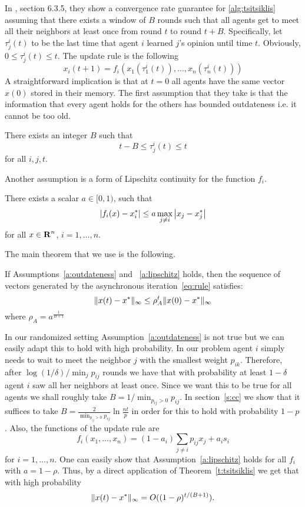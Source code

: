 In \cite{BT97}, section 6.3.5, they show a convergence rate guarantee for
\ref{alg:tsitsiklis} assuming that there exists
a window of $B$ rounds such that all agents get to meet all their
neighbors at least once from round $t$ to round $t+B$.
Specifically, let $\tau_j^i(t)$ to be the last time that agent $i$
learned $j$'s opinion until time $t$. Obviously, $0\leq \tau_j^i(t) \leq t$.
The update rule is the following
\begin{equation}\label{eq:rule}
x_i(t+1) = f_i(x_1(\tau_1^i(t)),\ldots, x_n(\tau_n^i(t)))
\end{equation}
A straightforward implication is that at $t =0$ all agents have the same 
vector $x(0)$ stored in their memory. 
The first assumption that they take is that the information that every agent
holds for the others has bounded outdateness i.e. it cannot be too old. 
\begin{assumption}\label{a:outdateness}
There exists an integer $B$ such that 
\[
t-B \leq \tau_j^i(t) \leq t
\]
for all $i,j,t$.
\end{assumption}
Another assumption is a form of Lipschitz continuity for the function $f_i$.
\begin{assumption}\label{a:lipschitz}
There exists a scalar $a \in [0,1)$, such that 
\[
\left|f_i(x) - x_i^*\right| \leq a \max_{j \neq i}\left|x_j - x_j^*\right|
\]
for all $x \in \bm{\mathrm{R}}^n$, $i = 1,\ldots, n$.
\end{assumption}
The main theorem that we use is the following. 
\begin{theorem}[{{\cite{BT97}}}]\label{t:tsitsiklis}
If Assumptions~\ref{a:outdateness} and ~\ref{a:lipschitz} holds, then the sequence of vectors generated 
by the asynchronous iteration~\ref{eq:rule} satisfies:
\[
\| x(t) - x^* \|_{\infty} \leq \rho_A^t\| x(0) - x^* \|_{\infty}
\]
where $\rho_A = a^{\frac{1}{B+1}}$
\end{theorem}
In our randomized setting Assumption~\ref{a:outdateness} is not true 
but we can easily adapt this to
hold with high probability. In our problem
agent $i$ simply needs to wait to meet the neighbor $j$ with the smallest
weight $p_{ik}$. Therefore, after $\log(1/\delta)/\min_{j} p_{ij}$ rounds
we have that with probability at least $1-\delta$ agent $i$ saw all her
neighbors at least once.  Since we want this to be true for all agents
we shall roughly take $B = 1/\min_{p_{ij} > 0} {p_{ij}}$.
In section~\ref{s:cc} we show that it suffices to take 
$B = \frac{2}{\min_{p_{ij} > 0} {p_{ij}}}\ln\frac{nt}{p}$
in order for this to hold with probability $1-p$.
Also, the functions of the update rule are
\[
f_i(x_1,\ldots,x_n) = (1-a_i)\sum_{j \neq i} p_{ij} x_j + a_i s_i
\] 
for $i = 1,\ldots,n$.
One can easily show that Assumption~\ref{a:lipschitz} holds for all $f_i$
with $a = 1 - \rho$. 
Thus, by a direct application of Theorem~\ref{t:tsitsiklis} 
we get that with high probability
\[
  \| x(t) - x^* \|_{\infty} = O((1-\rho)^{t/(B+1)}).
\]


